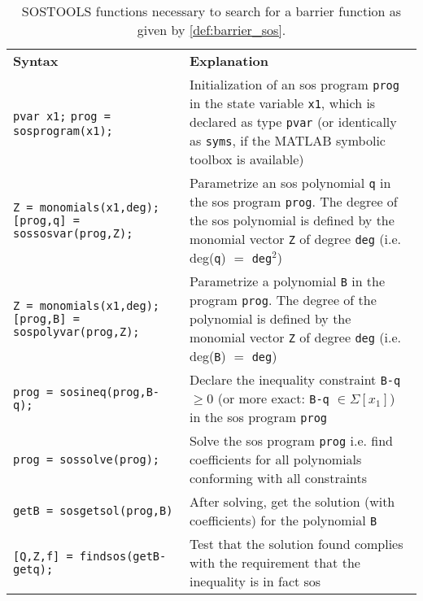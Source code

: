 \begin{table}[H]
\begin{tabularx}{\textwidth}{p{6cm} X}
\rowcolor{HeaderBlue}
\textbf{Syntax} & \textbf{Explanation}\\
\texttt{pvar x1;}\newline
\texttt{prog = sosprogram(x1);} & Initialization of an \gls{sos} program \texttt{prog} in the state variable \texttt{x1}, which is declared as  type \texttt{pvar} (or identically as \texttt{syms}, if the MATLAB symbolic toolbox is available)\\
\rowcolor{textBlue} 
\texttt{Z = monomials(x1,deg);}\newline
\texttt{[prog,q] = sossosvar(prog,Z);} & Parametrize an \gls{sos} polynomial \texttt{q} in the \gls{sos} program \texttt{prog}. The degree of the \gls{sos} polynomial is defined by the monomial vector \texttt{Z} of degree \texttt{deg} (i.e. deg(\texttt{q}) $=$ \texttt{deg}$^2$)\\
\texttt{Z = monomials(x1,deg);}\newline
\texttt{[prog,B] = sospolyvar(prog,Z);} & Parametrize a polynomial \texttt{B} in the program \texttt{prog}. The degree of the  polynomial is defined by the monomial vector \texttt{Z} of degree \texttt{deg} (i.e. deg(\texttt{B}) $=$ \texttt{deg})\\
\rowcolor{textBlue}
\texttt{prog = sosineq(prog,B-q);} & Declare the inequality constraint \texttt{B-q} $\geq 0$ (or more exact: \texttt{B-q} $\in\Sigma[x_1]$) in the \gls{sos} program \texttt{prog}\\
\texttt{prog = sossolve(prog);} & Solve the \gls{sos} program \texttt{prog} i.e. find coefficients for all polynomials conforming with all constraints \\
\rowcolor{textBlue}
\texttt{getB = sosgetsol(prog,B)} & After solving, get the solution (with coefficients) for the polynomial \texttt{B}\\
\texttt{[Q,Z,f] = findsos(getB-getq);} &  Test that the solution found complies with the requirement that the inequality is in fact \gls{sos}
\end{tabularx}
\caption{SOSTOOLS functions necessary to search for a barrier function as given by \autoref{def:barrier_sos}.}
\label{tab:sostools_syntax}
\end{table}

